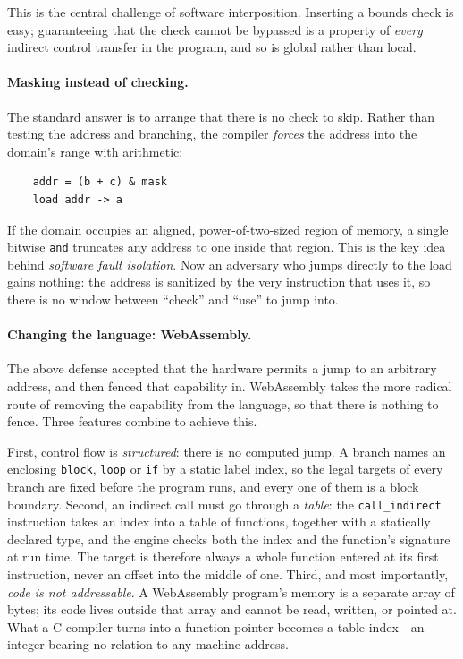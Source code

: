 This is the central challenge of software interposition.  Inserting a
bounds check is easy; guaranteeing that the check cannot be bypassed is
a property of \emph{every} indirect control transfer in the program,
and so is global rather than local.

\paragraph{Masking instead of checking.}
The standard answer is to arrange that there is no check to skip.
Rather than testing the address and branching, the compiler
\emph{forces} the address into the domain's range with arithmetic:
\begin{verbatim}
    addr = (b + c) & mask
    load addr -> a
\end{verbatim}
If the domain occupies an aligned, power-of-two-sized region of memory,
a single bitwise \texttt{and} truncates any address to one inside that
region.  This is the key idea behind \emph{software fault
isolation}.
Now an adversary who jumps directly
to the load gains nothing: the address is sanitized by the very
instruction that uses it, so there is no window between ``check'' and
``use'' to jump into.

\paragraph{Changing the language: WebAssembly.}
The above defense accepted that the hardware permits a jump to
an arbitrary address, and then fenced that capability in.  WebAssembly
takes the more radical route of removing the capability from the
language, so that there is nothing to fence.  Three features combine to
achieve this.

First, control flow is \emph{structured}: there is no computed jump.
A branch names an enclosing \texttt{block}, \texttt{loop} or
\texttt{if} by a static label index, so the legal targets of every
branch are fixed before the program runs, and every one of them is a
block boundary.  Second, an indirect call must go through a \emph{table}:
the \texttt{call\_indirect} instruction takes an index into a table of
functions, together with a statically declared type, and the engine
checks both the index and the function's signature at run time.  The
target is therefore always a whole function entered at its first
instruction, never an offset into the middle of one.  Third, and most
importantly, \emph{code is not addressable}.  A WebAssembly program's
memory is a separate array of bytes; its code lives outside that array
and cannot be read, written, or pointed at.  What a C compiler turns
into a function pointer becomes a table index---an integer bearing no
relation to any machine address.

